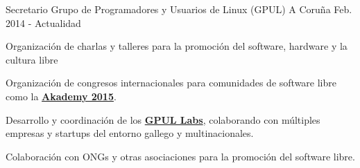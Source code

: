 


\begin{cventries}


\cventry
{Secretario} %
{Grupo de Programadores y Usuarios de Linux (GPUL)} %
{A Coruña} %
{Feb. 2014 - Actualidad} %
{ %
\begin{cvitems}
\item {Organización de charlas y talleres para la promoción del software, hardware y la cultura libre}
\item {Organización de congresos internacionales para comunidades de software libre como la \textbf{\href{https://akademy.kde.org/2015}{Akademy 2015}}.}
\item {Desarrollo y coordinación de los 
\textbf{\href{http://labs.gpul.org/}{GPUL Labs}}, colaborando con múltiples 
empresas y startups del entorno gallego y multinacionales.}
\item {Colaboración con ONGs y otras asociaciones para la promoción del 
software libre.}
\end{cvitems}
}



\end{cventries}